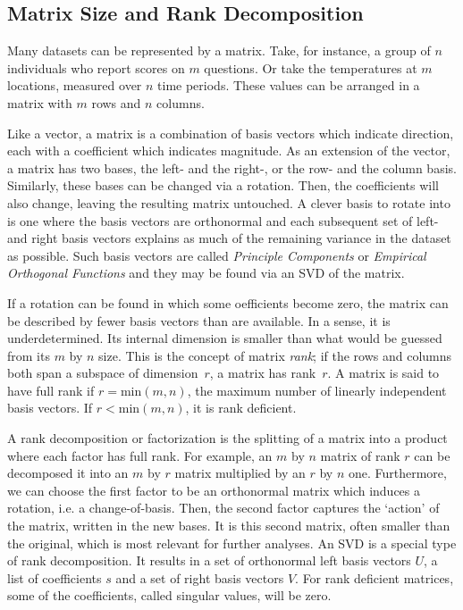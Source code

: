 \documentclass[sigconf]{acmart}
\begin{document}
\subsection{Matrix Size and Rank Decomposition}
\label{sec:Introduction Matrix Size and Rank Decomposition}

Many datasets can be represented by a matrix. Take, for instance, a group of $n$ individuals who report scores on $m$ questions. Or take the temperatures at $m$ locations, measured over $n$ time periods. These values can be arranged in a matrix with $m$ rows and $n$ columns.

Like a vector, a matrix is a combination of basis vectors which indicate direction, each with a coefficient which indicates magnitude. As an extension of the vector, a matrix has two bases, the left- and the right-, or the row- and the column basis. Similarly, these bases can be changed via a rotation. Then, the coefficients will also change, leaving the resulting matrix untouched. A clever basis to rotate into is one where the basis vectors are orthonormal and each subsequent set of left- and right basis vectors explains as much of the remaining variance in the dataset as possible. Such basis vectors are called \textit{Principle Components} or \textit{Empirical Orthogonal Functions} and they may be found via an SVD of the matrix.

If a rotation can be found in which some oefficients become zero, the matrix can be described by fewer basis vectors than are available. In a sense, it is underdetermined. Its internal dimension is smaller than what would be guessed from its $m$ by $n$ size. This is the concept of matrix \textit{rank}; if the rows and columns both span a subspace of dimension~$r$, a matrix has rank~$r$. A matrix is said to have full rank if $r = \text{min}(m, n)$, the maximum number of linearly independent basis vectors. If $r < \text{min}(m, n)$, it is rank deficient.

A rank decomposition or factorization is the splitting of a matrix into a product where each factor has full rank. For example, an $m$ by $n$ matrix of rank $r$ can be decomposed it into an $m$ by $r$ matrix multiplied by an $r$ by $n$ one. Furthermore, we can choose the first factor to be an orthonormal matrix which induces a rotation, i.e. a change-of-basis. Then, the second factor captures the `action' of the matrix, written in the new bases. It is this second matrix, often smaller than the original, which is most relevant for further analyses. An SVD is a special type of rank decomposition. It results in a set of orthonormal left basis vectors $U$, a list of coefficients $s$ and a set of right basis vectors $V$. For rank deficient matrices, some of the coefficients, called singular values, will be zero.
\end{document}
